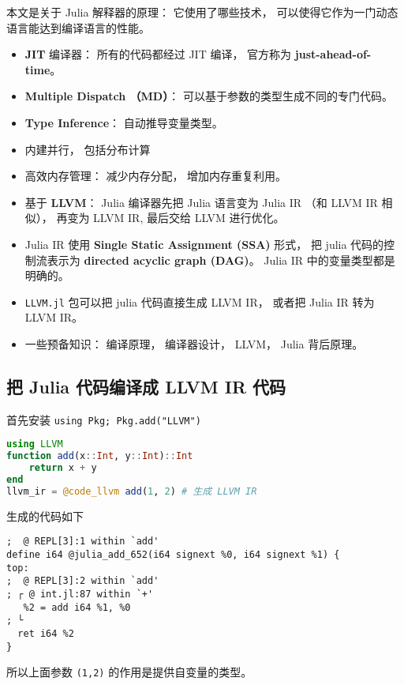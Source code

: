 
\begin{issues}
\issueDraft
\end{issues}

本文是关于 Julia 解释器的原理： 它使用了哪些技术， 可以使得它作为一门动态语言能达到编译语言的性能。

\begin{itemize}
\item \textbf{JIT} 编译器： 所有的代码都经过 JIT 编译， 官方称为 \textbf{just-ahead-of-time}。
\item \textbf{Multiple Dispatch （MD）}： 可以基于参数的类型生成不同的专门代码。
\item \textbf{Type Inference}： 自动推导变量类型。
\item 内建并行， 包括分布计算
\item 高效内存管理： 减少内存分配， 增加内存重复利用。
\item 基于 \textbf{LLVM}： Julia 编译器先把 Julia 语言变为 Julia IR （和 LLVM IR 相似）， 再变为 LLVM IR, 最后交给 LLVM 进行优化。
\item Julia IR 使用 \textbf{Single Static Assignment (SSA)} 形式， 把 julia 代码的控制流表示为 \textbf{directed acyclic graph (DAG)}。 Julia IR 中的变量类型都是明确的。
\item \verb|LLVM.jl| 包可以把 julia 代码直接生成 LLVM IR， 或者把 Julia IR 转为 LLVM IR。
\item 一些预备知识： 编译原理， 编译器设计， LLVM， Julia 背后原理。
\end{itemize}

\subsection{把 Julia 代码编译成 LLVM IR 代码}
首先安装 \verb|using Pkg; Pkg.add("LLVM")|
\begin{lstlisting}[language=julia]
using LLVM
function add(x::Int, y::Int)::Int
    return x + y
end
llvm_ir = @code_llvm add(1, 2) # 生成 LLVM IR
\end{lstlisting}
生成的代码如下
\begin{lstlisting}[language=none]
;  @ REPL[3]:1 within `add'
define i64 @julia_add_652(i64 signext %0, i64 signext %1) {
top:
;  @ REPL[3]:2 within `add'
; ┌ @ int.jl:87 within `+'
   %2 = add i64 %1, %0
; └
  ret i64 %2
}
\end{lstlisting}
所以上面参数 \verb|(1,2)| 的作用是提供自变量的类型。
